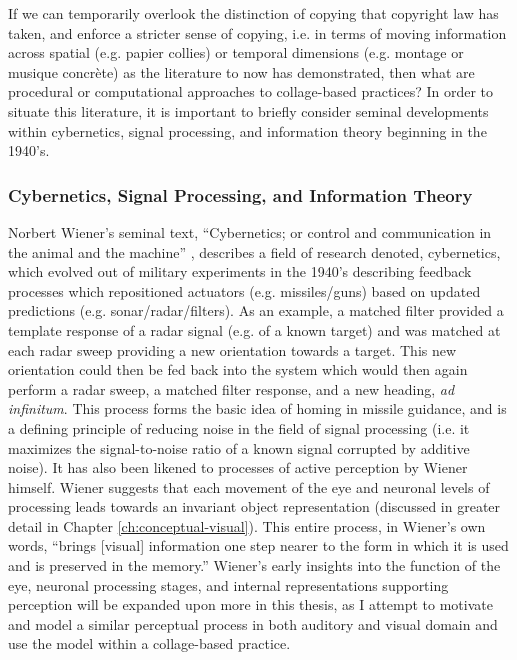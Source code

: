 \documentclass[a4paper,10pt,final]{ThesisStyle}
\begin{document}
If we can temporarily overlook the distinction of copying that copyright law has taken, and enforce a stricter sense of copying, i.e. in terms of moving information across spatial (e.g. papier collies) or temporal dimensions (e.g. montage or musique concr\`{e}te) as the literature to now has demonstrated, then what are procedural or computational approaches to collage-based practices?  In order to situate this literature, it is important to briefly consider seminal developments within cybernetics, signal processing, and information theory beginning in the 1940's.

\subsubsection{Cybernetics, Signal Processing, and Information Theory}

Norbert Wiener's seminal text, ``Cybernetics; or control and communication in the animal and the machine'' \cite{Wiener1948}, describes a field of research denoted, cybernetics, which evolved out of military experiments in the 1940's describing feedback processes which repositioned actuators (e.g. missiles/guns) based on updated predictions (e.g. sonar/radar/filters).  As an example, a matched filter provided a template response of a radar signal (e.g. of a known target) and was matched at each radar sweep providing a new orientation towards a target.  This new orientation could then be fed back into the system which would then again perform a radar sweep, a matched filter response, and a new heading, \textit{ad infinitum}.  This process forms the basic idea of homing in missile guidance, and is a defining principle of reducing noise in the field of signal processing (i.e. it maximizes the signal-to-noise ratio of a known signal corrupted by additive noise).   It has also been likened to processes of active perception by Wiener himself.  Wiener suggests that each movement of the eye and neuronal levels of processing leads towards an invariant object representation (discussed in greater detail in Chapter \ref{ch:conceptual-visual}).  This entire process, in Wiener's own words, ``brings [visual] information one step nearer to the form in which it is used and is preserved in the memory.''  Wiener's early insights into the function of the eye, neuronal processing stages, and internal representations supporting perception will be expanded upon more in this thesis, as I attempt to motivate and model a similar perceptual process in both auditory and visual domain and use the model within a collage-based practice.
\end{document}
